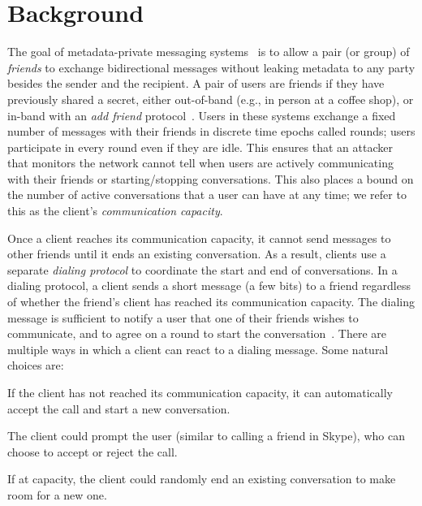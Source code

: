 \section{Background}%
\label{s:bg}

The goal of metadata-private messaging systems~\cite{vandenhoof15vuvuzela,
  kwon17atom, alexopoulos17mcmix, tyagi17stadium, angel16unobservable}
  is to allow a pair (or group) of \emph{friends} to exchange bidirectional 
  messages without leaking metadata to any party besides the sender and the 
  recipient.
A pair of users are friends if they have previously shared a secret, either
  out-of-band (e.g., in person at a coffee shop), or in-band with 
  an \emph{add friend} protocol~\cite{lazar16alpenhorn}.
Users in these systems exchange a fixed number of messages with their friends 
  in discrete time epochs called rounds; users participate in every round even 
  if they are idle.
This ensures that an attacker that monitors the network cannot tell when users
  are actively communicating with their friends or starting/stopping 
  conversations.
This also places a bound on the number of active conversations that a user can 
  have at any time; we refer to this as the client's 
  \emph{communication capacity}.

Once a client reaches its communication capacity, it cannot send 
  messages to other friends until it ends an existing conversation.
As a result, clients use a separate \emph{dialing protocol} to 
  coordinate the start and end of conversations.
In a dialing protocol, a client sends a short message (a few bits) 
  to a friend regardless of whether the friend's client has reached its communication 
  capacity.
The dialing message is sufficient to notify a user that one of their friends 
  wishes to communicate, and to agree on a round to start the 
  conversation~\cite{lazar16alpenhorn}.
There are multiple ways in which a client can react to a dialing message.
Some natural choices are:

\begin{myitemize}
\item If the client has not reached its communication capacity, it can 
  automatically accept the call and start a new conversation.
\item The client could prompt the user (similar to calling a friend in Skype), 
  who can choose to accept or reject the call.
\item If at capacity, the client could randomly end an existing conversation 
  to make room for a new one.
\end{myitemize}

